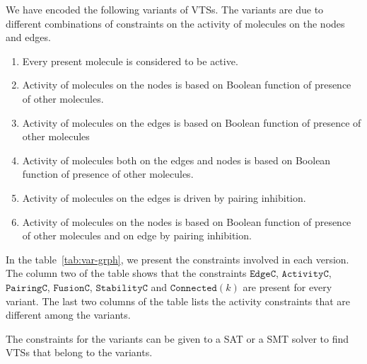 We have encoded the following variants of VTSs.
%
The variants are due to different combinations of constraints on the
activity of molecules on the nodes and edges.
%
\begin{enumerate}
\item Every present molecule is considered to be active.
\item Activity of molecules on the nodes is based on Boolean function of presence of other molecules. 
\item Activity of molecules on the edges is based on Boolean function of presence of other molecules
\item Activity of molecules both on the edges and nodes is based on Boolean function of presence of other molecules.
\item Activity of molecules on the edges is driven by pairing inhibition.
\item Activity of molecules on the nodes is based on Boolean function of presence of other molecules and on edge by pairing inhibition.
\end{enumerate}
%
%

In the table~\ref{tab:var-grph}, we present the constraints involved in each version.
%
The column two of the table shows that the constraints $\texttt{EdgeC}$, $\texttt{ActivityC}$, $\texttt{PairingC}$, $\texttt{FusionC}$, $\texttt{StabilityC}$ and $\texttt{Connected}(k)$ are present for every variant.
%
The last two columns of the table lists the activity constraints that are different among the variants.
%
%
%
%
%

%
The constraints for the variants can be given to a SAT or a SMT solver to find
VTSs that belong to the variants.
